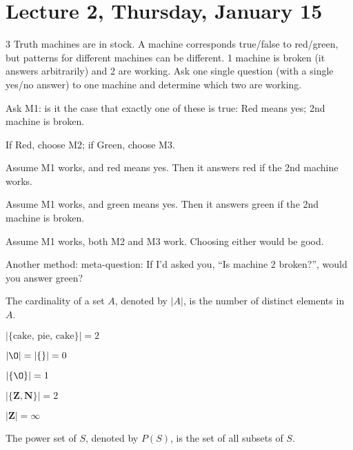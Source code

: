 \section{Lecture 2, Thursday, January 15}

\begin{ex}
3 Truth machines are in stock. A machine corresponds true/false to red/green, but patterns for different machines can be different. 1 machine is broken (it answers arbitrarily) and 2 are working. Ask one single question (with a single yes/no answer) to one machine and determine which two are working.
\end{ex}

\begin{soln}
Ask M1: is it the case that exactly one of these is true: Red means yes; 2nd
machine is broken.

If Red, choose M2; if Green, choose M3.

Assume M1 works, and red means yes. Then it answers red if the 2nd machine
works.

Assume M1 works, and green means yes. Then it answers green if the 2nd machine
is broken.

Assume M1 works, both M2 and M3 work. Choosing either would be good.


Another method: meta-question: If I'd asked you, ``Is machine 2 broken?'', would
you answer green?
\end{soln}

\begin{defn}

The cardinality of a set $A$, denoted by $|A|$, is the number of distinct elements in $A$.

\end{defn}

\begin{ex}
$|\{\text{cake, pie, cake}\}| = 2$
\end{ex}
\begin{ex}
$|\O| = |\{\}| = 0$
\end{ex}
\begin{ex}
$|\{\O\}| = 1$
\end{ex}
\begin{ex}
$|\{\mathbf{Z}, \mathbf{N}\}| = 2$
\end{ex}
\begin{ex}
$|\mathbf{Z}| = \infty$
\end{ex}
\begin{defn}

The power set of $S$, denoted by $P(S)$, is the set of all subsets of $S$.

\end{defn}

